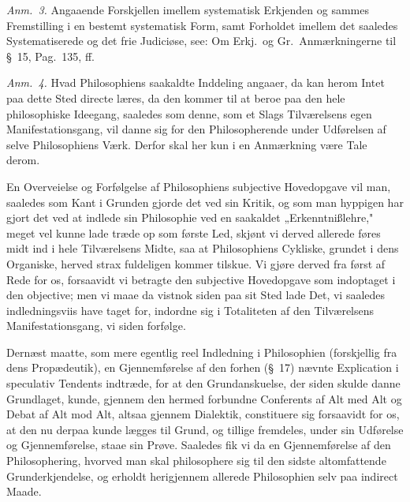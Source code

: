 \documentclass[12pt,a4paper]{book}
\newcommand{\apage}[1]{\marginnote{\footnotesize\textit{[#1]}}}
\begin{document}
{\small\emph{Anm.~3.} Angaaende Forskjellen imellem systematisk Erkjenden og sammes
Fremstilling i en bestemt systematisk Form, samt Forholdet imellem det saaledes
Systematiserede og det frie Judiciøse, see: Om Erkj.\ og Gr.\ Anmærkningerne til
\S~15, Pag.\ 135, ff.\par}

{\small\emph{Anm.~4.} Hvad Philosophiens saakaldte Inddeling angaaer, da kan herom
Intet paa dette Sted directe læres, da den kommer til at beroe paa den hele
philosophiske Ideegang, saaledes som denne, som et Slags Tilværelsens egen
Manifestationsgang, vil danne sig for den Philosopherende under Udførelsen af selve
Philosophiens Værk. Derfor skal her kun i en Anmærkning være Tale derom.\par}
  \apage{74}
{\small

En Overveielse og Forfølgelse af Philosophiens subjective Hovedopgave vil
man, saaledes som Kant i Grunden gjorde det ved sin Kritik, og som man hyppigen har
gjort det ved at indlede sin Philosophie ved en saakaldet „Erkenntnißlehre," meget
vel kunne lade træde op som første Led, skjønt vi derved allerede føres midt ind i
hele Tilværelsens Midte, saa at Philosophiens Cykliske, grundet i dens Organiske,
herved strax fuldeligen kommer tilskue. Vi gjøre derved fra først af Rede for os,
forsaavidt vi betragte den subjective Hovedopgave som indoptaget i den objective; men
vi maae da vistnok siden paa sit Sted lade Det, vi saaledes indledningsviis have
taget for, indordne sig i Totaliteten af den Tilværelsens Manifestationsgang, vi
siden forfølge.\par}

{\small Dernæst maatte, som mere egentlig reel Indledning i Philosophien (forskjellig
fra dens Propædeutik), en Gjennemførelse af den forhen (\S~17) nævnte Explication i
speculativ Tendents indtræde, for at den Grundanskuelse, der siden skulde danne
Grundlaget, kunde, gjennem den hermed forbundne Conferents af Alt med Alt og Debat af
Alt mod Alt, altsaa gjennem Dialektik, constituere sig forsaavidt for os, at den nu
derpaa kunde lægges til Grund, og tillige fremdeles, under sin Udførelse og
Gjennemførelse, staae sin Prøve. Saaledes fik vi da en Gjennemførelse af den
Philosophering, hvorved man skal philosophere sig til den sidste altomfattende
Grunderkjendelse, og erholdt herigjennem allerede Philosophien selv paa indirect
Maade.\par}
\end{document}
